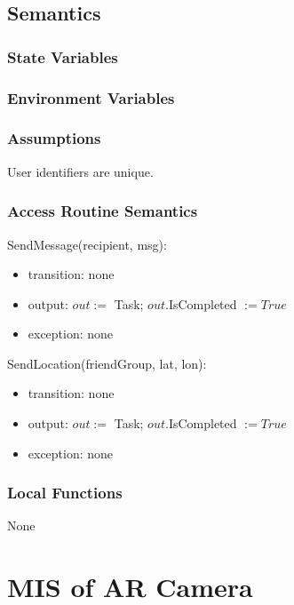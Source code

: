 \documentclass[12pt, titlepage]{article}
\begin{document}
\begin{itemize}
\begin{center}
\begin{tabular}{p{2cm} p{4cm} p{4cm} p{2cm}}
\hline
\end{tabular}
\end{center}

\subsection{Semantics}

\subsubsection{State Variables}

\subsubsection{Environment Variables}

\subsubsection{Assumptions}

User identifiers are unique.

\subsubsection{Access Routine Semantics}

\noindent SendMessage(recipient, msg):
\begin{itemize}
\item transition: none
\item output: $out :=$ Task; $out$.IsCompleted $:= True$
\item exception: none
\end{itemize}

\noindent SendLocation(friendGroup, lat, lon):
\begin{itemize}
\item transition: none
\item output: $out :=$ Task; $out$.IsCompleted $:= True$
\item exception: none
\end{itemize}

\subsubsection{Local Functions}

None

\newpage

\section{MIS of AR Camera} \label{mARCamera}


\end{itemize}
\end{document}
